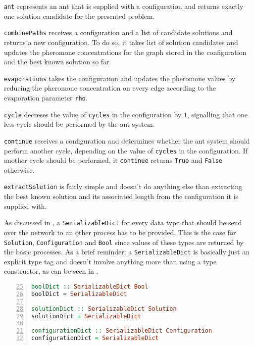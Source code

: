 \texttt{ant} represents an ant that is supplied with a configuration and returns exactly one solution candidate for the presented problem.

\texttt{combinePaths} receives a configuration and a list of candidate solutions and returns a new configuration. To do so, it takes list of solution candidates and updates the pheromone concentrations for the graph stored in the configuration and the best known solution so far.

\texttt{evaporations} takes the configuration and updates the pheromone values by reducing the pheromone concentration on every edge according to the evaporation parameter \texttt{rho}.

\texttt{cycle} decreses the value of \texttt{cycles} in the configuration by $1$, signalling that one less cycle should be performed by the ant system.

\texttt{continue} receives a configuration and determines whether the ant system should perform another cycle, depending on the value of \texttt{cycles} in the configuration. If another cycle should be performed, it \texttt{continue} returns \texttt{True} and \texttt{False} otherwise.

\texttt{extractSolution} is fairly simple and doesn't do anything else than extracting the best known solution and its associated length from the configuration it is supplied with.

As discussed in , a \texttt{SerializableDict} for every data type that should be send over the network to an other process has to be provided. This is the case for \texttt{Solution}, \texttt{Configuration} and \texttt{Bool} since values of these types are returned by the basic processes. As a brief reminder: a \texttt{SerializableDict} is basically just an explicit type tag and doesn't involve anything more than using a type constructor, as can be seen in .

\begin{lstlisting}[language=Haskell,frame=tb,numbers=left,label=lst:ant_dicts,caption=Dictionaries for data serialisation.,firstnumber=25]
boolDict :: SerializableDict Bool
boolDict = SerializableDict

solutionDict :: SerializableDict Solution
solutionDict = SerializableDict

configurationDict :: SerializableDict Configuration
configurationDict = SerializableDict
\end{lstlisting}


